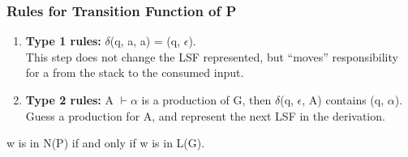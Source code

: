 \documentclass{report}
\begin{document}
\subsubsection{Rules for Transition Function of P}
\begin{enumerate}
    \item \textbf{Type 1 rules:} $\delta$(q, a, a) = (q, $\epsilon$). \\
    This step does not change the LSF represented, but “moves” responsibility for a from the stack to the consumed input.
    \item \textbf{Type 2 rules:} A $\vdash \alpha$ is a production of G, then $\delta$(q, $\epsilon$, A) contains (q, $\alpha$). \\
    Guess a production for A, and represent the next LSF in the derivation.
\end{enumerate}
w is in N(P) if and only if w is in L(G).
\end{document}
